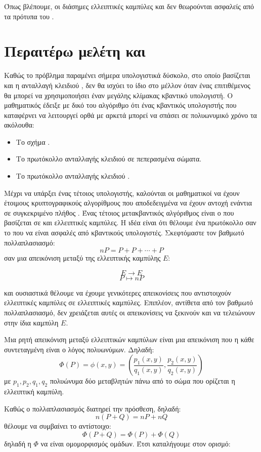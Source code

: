\documentclass[oneside,a4paper]{article}
\begin{document}
Όπως βλέπουμε, οι διάσημες ελλειπτικές καμπύλες  και  δεν θεωρούνται ασφαλείς από τα πρότυπα του .

\pagebreak
\section{Περαιτέρω μελέτη και }

Καθώς το πρόβλημα  παραμένει σήμερα υπολογιστικά δύσκολο, στο οποίο βασίζεται και η ανταλλαγή κλειδιού , δεν θα ισχύει το ίδιο στο μέλλον όταν ένας επιτιθέμενος θα μπορεί να χρησιμοποιήσει έναν μεγάλης κλίμακας κβαντικό υπολογιστή. Ο μαθηματικός  έδειξε με δικό του αλγόριθμο  ότι ένας κβαντικός υπολογιστής που καταφέρνει να λειτουργεί ορθά με αρκετά  μπορεί να σπάσει σε πολυωνυμικό χρόνο τα ακόλουθα:
\begin{itemize}
	\item Το σχήμα .
	\item Το πρωτόκολλο ανταλλαγής κλειδιού  σε πεπερασμένα σώματα.
	\item Το πρωτόκολλο ανταλλαγής κλειδιού .
\end{itemize} 

Μέχρι να υπάρξει ένας τέτοιος υπολογιστής, καλούνται οι μαθηματικοί να έχουν έτοιμους κρυπτογραφικούς αλγορίθμους που αποδεδειγμένα να έχουν αντοχή ενάντια σε συγκεκριμένο πλήθος . Ένας τέτοιος μετακβαντικός αλγόριθμος είναι ο  που βασίζεται σε  και  ελλειπτικές καμπύλες. Η ιδέα είναι ότι θέλουμε ένα πρωτόκολλο σαν το  που να είναι ασφαλές από κβαντικούς υπολογιστές. Σκεφτόμαστε τον βαθμωτό πολλαπλασιασμό:
$$n P  = P + P + \cdots + P$$ σαν μια απεικόνιση μεταξύ της ελλειπτικής καμπύλης $E$:

$$ E \longrightarrow E$$
$$ P \longmapsto n P$$

και ουσιαστικά θέλουμε να έχουμε γενικότερες απεικονίσεις που αντιστοιχούν ελλειπτικές καμπύλες σε ελλειπτικές καμπύλες. Επιπλέον, αντίθετα από τον βαθμωτό πολλαπλασιασμό, δεν χρειάζεται αυτές οι απεικονίσεις να ξεκινούν και να τελειώνουν στην ίδια καμπύλη $E$. 

\begin{defn}
	Μια ρητή απεικόνιση μεταξύ ελλειπτικών καμπύλων είναι μια απεικόνιση που η κάθε συντεταγμένη είναι ο λόγος πολυωνύμων. Δηλαδή:
	$$\Phi(P) = \phi(x,y) = \left(\frac{p_1(x,y)}{q_1(x,y)}, \frac{p_2(x,y)}{q_2(x,y)}\right)$$ με $p_1,p_2,q_1,q_2$ πολυώνυμα δύο μεταβλητών πάνω από το σώμα που ορίζεται η ελλειπτική καμπύλη.
\end{defn}
Καθώς ο πολλαπλασιασμός διατηρεί την πρόσθεση, δηλαδή:
$$n(P+Q) = nP + nQ$$ θέλουμε να συμβαίνει το αντίστοιχο:
$$\Phi(P+Q) = \Phi(P) + \Phi(Q)$$ δηλαδή η $\Phi$ να είναι ομομορφισμός ομάδων. Έτσι καταλήγουμε στον ορισμό:
\end{document}
